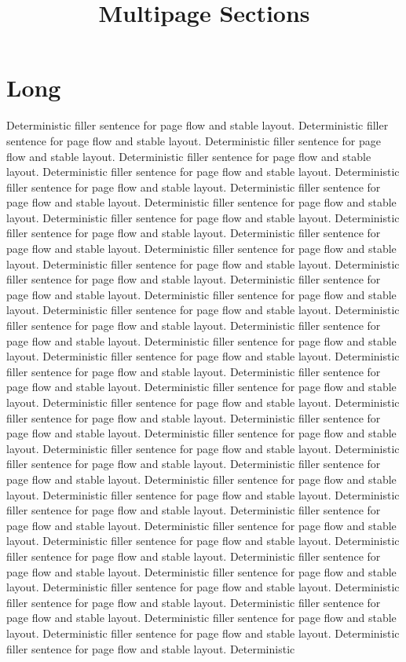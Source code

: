 \documentclass{article}
\begin{document}
\title{Multipage Sections}\maketitle
\section{Long} Deterministic filler sentence for page flow and stable layout. Deterministic filler sentence for page flow and stable layout. Deterministic filler sentence for page flow and stable layout. Deterministic filler sentence for page flow and stable layout. Deterministic filler sentence for page flow and stable layout. Deterministic filler sentence for page flow and stable layout. Deterministic filler sentence for page flow and stable layout. Deterministic filler sentence for page flow and stable layout. Deterministic filler sentence for page flow and stable layout. Deterministic filler sentence for page flow and stable layout. Deterministic filler sentence for page flow and stable layout. Deterministic filler sentence for page flow and stable layout. Deterministic filler sentence for page flow and stable layout. Deterministic filler sentence for page flow and stable layout. Deterministic filler sentence for page flow and stable layout. Deterministic filler sentence for page flow and stable layout. Deterministic filler sentence for page flow and stable layout. Deterministic filler sentence for page flow and stable layout. Deterministic filler sentence for page flow and stable layout. Deterministic filler sentence for page flow and stable layout. Deterministic filler sentence for page flow and stable layout. Deterministic filler sentence for page flow and stable layout. Deterministic filler sentence for page flow and stable layout. Deterministic filler sentence for page flow and stable layout. Deterministic filler sentence for page flow and stable layout. Deterministic filler sentence for page flow and stable layout. Deterministic filler sentence for page flow and stable layout. Deterministic filler sentence for page flow and stable layout. Deterministic filler sentence for page flow and stable layout. Deterministic filler sentence for page flow and stable layout. Deterministic filler sentence for page flow and stable layout. Deterministic filler sentence for page flow and stable layout. Deterministic filler sentence for page flow and stable layout. Deterministic filler sentence for page flow and stable layout. Deterministic filler sentence for page flow and stable layout. Deterministic filler sentence for page flow and stable layout. Deterministic filler sentence for page flow and stable layout. Deterministic filler sentence for page flow and stable layout. Deterministic filler sentence for page flow and stable layout. Deterministic filler sentence for page flow and stable layout. Deterministic filler sentence for page flow and stable layout. Deterministic filler sentence for page flow and stable layout. Deterministic filler sentence for page flow and stable layout. Deterministic filler sentence for page flow and stable layout. Deterministic filler sentence for page flow and stable layout. Deterministic filler sentence for page flow and stable layout. Deterministic 
\end{document}
